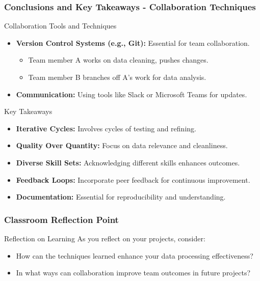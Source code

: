 \documentclass[aspectratio=169]{beamer}
\begin{document}
\begin{frame}[fragile]
    \frametitle{Conclusions and Key Takeaways - Collaboration Techniques}
    
    \begin{block}{Collaboration Tools and Techniques}
        \begin{itemize}
            \item \textbf{Version Control Systems (e.g., Git):} Essential for team collaboration.
            \begin{itemize}
                \item Team member A works on data cleaning, pushes changes.
                \item Team member B branches off A's work for data analysis.
            \end{itemize}
            \item \textbf{Communication:} Using tools like Slack or Microsoft Teams for updates.
        \end{itemize}
    \end{block}
    
    \begin{block}{Key Takeaways}
        \begin{itemize}
            \item \textbf{Iterative Cycles:} Involves cycles of testing and refining.
            \item \textbf{Quality Over Quantity:} Focus on data relevance and cleanliness.
            \item \textbf{Diverse Skill Sets:} Acknowledging different skills enhances outcomes.
            \item \textbf{Feedback Loops:} Incorporate peer feedback for continuous improvement.
            \item \textbf{Documentation:} Essential for reproducibility and understanding.
        \end{itemize}
    \end{block}
\end{frame}

\begin{frame}[fragile]
    \frametitle{Classroom Reflection Point}
    
    \begin{block}{Reflection on Learning}
    As you reflect on your projects, consider:
    \begin{itemize}
        \item How can the techniques learned enhance your data processing effectiveness?
        \item In what ways can collaboration improve team outcomes in future projects?
    \end{itemize}
    \end{block}
\end{frame}
\end{document}
